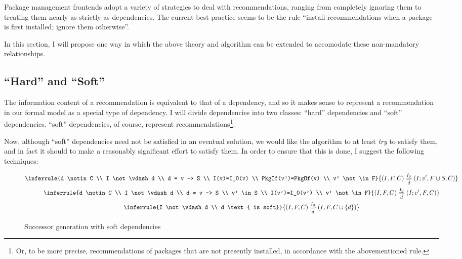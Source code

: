 \documentclass[letterpaper]{article}
\theoremstyle{definition}
\theoremstyle{remark}
\newcommand{\pkgof}[1]{PkgOf(#1)}
\newcommand{\nsol}[2]{\overset{#1}{\underset{#2}{\Rightarrow}}}
\newcommand{\satisfies}{\vdash}
\begin{document}
Package management frontends adopt a variety of strategies to deal
with recommendations, ranging from completely ignoring them to
treating them nearly as strictly as dependencies.  The current best
practice seems to be the rule ``install recommendations when a package
is first installed; ignore them otherwise''.

In this section, I will propose one way in which the above theory and
algorithm can be extended to accomodate these non-mandatory
relationships.

\subsection{``Hard'' and ``Soft''}

The information content of a recommendation is equivalent to that of a
dependency, and so it makes sense to represent a recommendation in our
formal model as a special type of dependency.  I will divide
dependencies into two classes: ``hard'' dependencies and ``soft''
dependencies.  ``soft'' dependencies, of course, represent
recommendations\footnote{Or, to be more precise, recommendations of
  packages that are not presently installed, in accordance with the
  abovementioned rule.}.

Now, although ``soft'' dependencies need not be satisfied in an
eventual solution, we would like the algorithm to at least \emph{try}
to satisfy them, and in fact it should to make a reasonably
significant effort to satisfy them.  In order to ensure that this is
done, I suggest the following techniques:

\begin{figure}
  \begin{gather*}
    \inferrule{d \notin C \\
      I \not \satisfies d \\ d = v -> S \\
      I(v)=I_0(v) \\ \pkgof{v'}=\pkgof{v} \\ v' \not \in F}
    {(I,F,C) \nsol{I_0}{d} (I;v',F \cup S,C)} \\
    \inferrule{d \notin C \\
      I \not \satisfies d \\ d = v -> S \\ v' \in S \\
      I(v')=I_0(v') \\ v' \not \in F}
    {(I,F,C) \nsol{I_0}{d} (I;v', F,C)} \\
    \inferrule{I \not \satisfies d \\ d \text{ is soft}}
    {(I,F,C) \nsol{I_0}{d} (I,F,C \cup \{d\})}
  \end{gather*}

  \caption{Successor generation with soft dependencies}
  \label{fig:softdep}
\end{figure}
\end{document}
